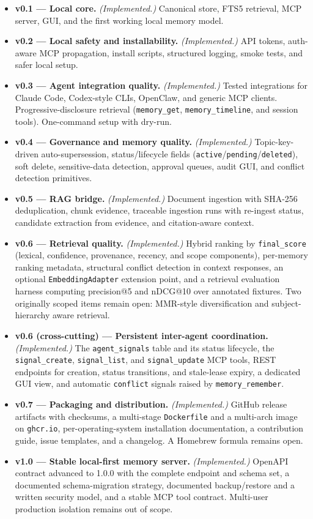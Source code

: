 \documentclass[11pt,a4paper]{article}
\begin{document}
\begin{itemize}
 \item \textbf{v0.1 --- Local core.} \textit{(Implemented.)} Canonical store, FTS5 retrieval, MCP server, GUI, and the first working local memory model.
 \item \textbf{v0.2 --- Local safety and installability.} \textit{(Implemented.)} API tokens, auth-aware MCP propagation, install scripts, structured logging, smoke tests, and safer local setup.
 \item \textbf{v0.3 --- Agent integration quality.} \textit{(Implemented.)} Tested integrations for Claude Code, Codex-style CLIs, OpenClaw, and generic MCP clients. Progressive-disclosure retrieval (\texttt{memory\_get}, \texttt{memory\_timeline}, and session tools). One-command setup with dry-run.
 \item \textbf{v0.4 --- Governance and memory quality.} \textit{(Implemented.)} Topic-key-driven auto-supersession, status/lifecycle fields (\texttt{active}/\texttt{pending}/\texttt{deleted}), soft delete, sensitive-data detection, approval queues, audit GUI, and conflict detection primitives.
 \item \textbf{v0.5 --- RAG bridge.} \textit{(Implemented.)} Document ingestion with SHA-256 deduplication, chunk evidence, traceable ingestion runs with re-ingest status, candidate extraction from evidence, and citation-aware context.
 \item \textbf{v0.6 --- Retrieval quality.} \textit{(Implemented.)} Hybrid ranking by \texttt{final\_score} (lexical, confidence, provenance, recency, and scope components), per-memory ranking metadata, structural conflict detection in context responses, an optional \texttt{EmbeddingAdapter} extension point, and a retrieval evaluation harness computing precision@5 and nDCG@10 over annotated fixtures. Two originally scoped items remain open: MMR-style diversification and subject-hierarchy aware retrieval.
 \item \textbf{v0.6 (cross-cutting) --- Persistent inter-agent coordination.} \textit{(Implemented.)} The \texttt{agent\_signals} table and its status lifecycle, the \texttt{signal\_create}, \texttt{signal\_list}, and \texttt{signal\_update} MCP tools, REST endpoints for creation, status transitions, and stale-lease expiry, a dedicated GUI view, and automatic \texttt{conflict} signals raised by \texttt{memory\_remember}.
 \item \textbf{v0.7 --- Packaging and distribution.} \textit{(Implemented.)} GitHub release artifacts with checksums, a multi-stage \texttt{Dockerfile} and a multi-arch image on \texttt{ghcr.io}, per-operating-system installation documentation, a contribution guide, issue templates, and a changelog. A Homebrew formula remains open.
 \item \textbf{v1.0 --- Stable local-first memory server.} \textit{(Implemented.)} OpenAPI contract advanced to 1.0.0 with the complete endpoint and schema set, a documented schema-migration strategy, documented backup/restore and a written security model, and a stable MCP tool contract. Multi-user production isolation remains out of scope.
\end{itemize}
\end{document}
